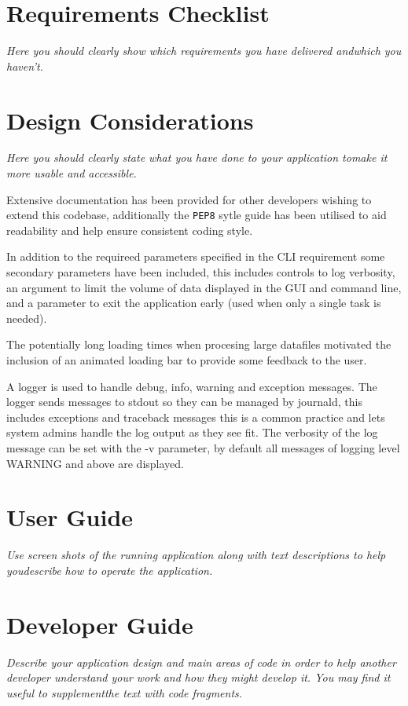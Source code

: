 \documentclass[11pt]{article}
\newcommand{\code}[1]{\colorbox{light-gray}{\texttt{#1}}}
\begin{document}
\section{Requirements Checklist}
\emph{Here you should clearly show which requirements you have delivered andwhich you haven’t.}




\section{Design Considerations}
\emph{Here you should clearly state what you have done to your application tomake it more usable and accessible.}

Extensive documentation has been provided for other developers wishing to extend this codebase, additionally the \code{PEP8} sytle guide has been utilised to aid readability and help ensure consistent coding style. 

In addition to the requireed parameters specified in the CLI requirement some secondary parameters have been included, this includes controls to log verbosity, an argument to limit the volume of data displayed in the GUI and command line, and a parameter to exit the application early (used when only a single task is needed).

The potentially long loading times when procesing large datafiles motivated the inclusion of an animated loading bar to provide some feedback to the user.

A logger is used to handle debug, info, warning and exception messages. The logger sends messages to stdout so they can be managed by journald, this includes exceptions and traceback messages this is a common practice and lets system admins handle the log output as they see fit. The verbosity of the log message can be set with the -v parameter, by default all messages of logging level WARNING and above are displayed.




\section{User Guide}
\emph{Use screen shots of the running application along with text descriptions to help youdescribe how to operate the application.}

\section{Developer Guide}
\emph{Describe your application design and main areas of code in order to help another developer understand your work and how they might develop it. You may find it useful to supplementthe text with code fragments.}
\end{document}
